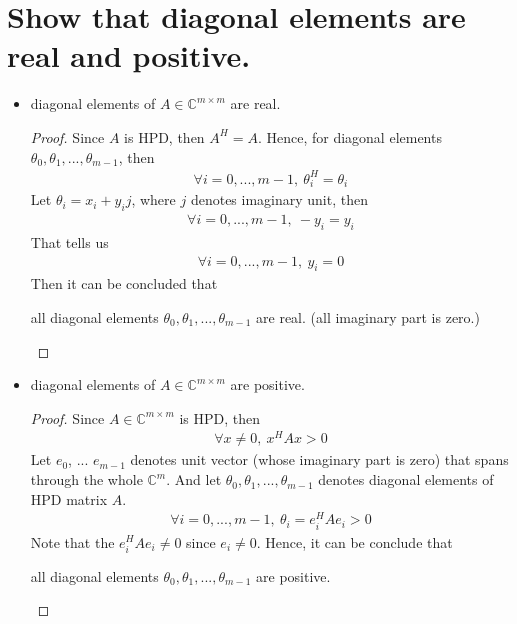 \documentclass[11pt,a4paper]{article}
\begin{document}
\setcounter{section}{3}
\section{Show that diagonal elements are real and positive.}
\begin{itemize}
    \item diagonal elements of $A\in\mathbb{C}^{m\times m}$ are real.
        \begin{proof}
        Since $A$ is HPD, then $A^H = A$. Hence, for diagonal elements
        $\theta_0, \theta_1, ..., \theta_{m-1}$, then 
        \begin{align}
            \forall i = 0, ..., m-1,\ \theta_i^H = \theta_i
        \end{align}
        Let $\theta_i = x_i + y_i j$, where $j$ denotes imaginary unit, then
        \begin{align}
            \forall i = 0, ..., m-1,\ -y_i = y_i
        \end{align}
        That tells us 
        \begin{align}
            \forall i = 0, ..., m-1,\ y_i = 0
        \end{align}
        Then it can be concluded that 
       \begin{center} 
        all diagonal elements $\theta_0, \theta_1, ..., \theta_{m-1}$
        are real. (all imaginary part is zero.)
        \end{center}
        \end{proof}
    \item diagonal elements of $A\in\mathbb{C}^{m\times m}$ are positive.
        \begin{proof}
            Since $A\in\mathbb{C}^{m\times m}$ is HPD, then
            \begin{align}
                \forall x \not = 0,\ x^H A x > 0
            \end{align}
            Let $e_0$, ... $e_{m-1}$ denotes unit vector (whose 
            imaginary part is zero) that spans through the whole $\mathbb{C}^{m}$. 
            And let $\theta_0, \theta_1, ..., \theta_{m-1}$ denotes diagonal
            elements of HPD matrix $A$.
        \begin{align}
            \forall i = 0, ..., m-1,\ \theta_i = e_i^H A e_i > 0
        \end{align}
        Note that the $e_i^H A e_i \not = 0$ since $e_i \not = 0$. Hence, it
        can be conclude that 
       \begin{center} 
        all diagonal elements $\theta_0, \theta_1, ..., \theta_{m-1}$
        are positive. 
        \end{center}
        \end{proof}
\end{itemize}
\newpage
\setcounter{section}{13}
\end{document}
